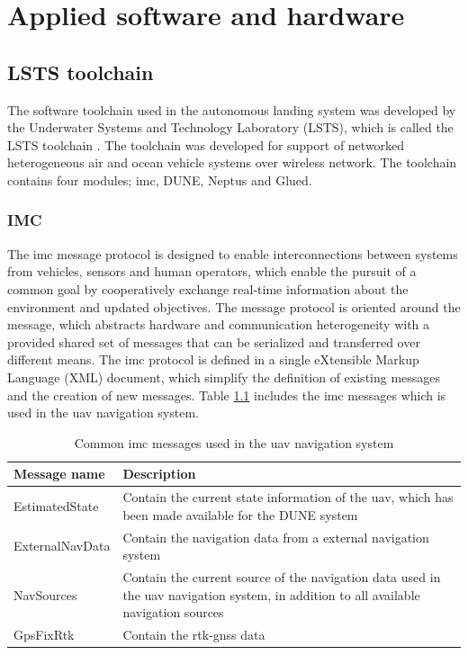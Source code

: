 \chapter{Applied software and hardware}
\section{LSTS toolchain}
The software toolchain used in the autonomous landing system was developed by the Underwater Systems and Technology Laboratory (LSTS), which is called the LSTS toolchain \citep{pinto2013lsts}. The toolchain was developed for support of networked heterogeneous air and ocean vehicle systems over wireless network. The toolchain contains four modules; \gls{imc}, DUNE, Neptus and Glued.
\subsection{IMC}
The \acrfull{imc} message protocol \citep{martins2009imc} is designed to enable interconnections between systems from vehicles, sensors and human operators, which enable the pursuit of a common goal by cooperatively exchange real-time information about the environment and updated objectives. The message protocol is oriented around the message, which abstracts hardware and communication heterogeneity with a provided shared set of messages that can be serialized and transferred over different means. The \gls{imc} protocol is defined in a single eXtensible Markup Language (XML) document, which simplify the definition of existing messages and the creation of new messages. Table \ref{Tb:IMCmessages} includes the \gls{imc} messages which is used in the \gls{uav} navigation system.
\begin{table}[H]
\centering
\begin{tabular}{| p{2.5cm} | p{9cm} |}
\hline
\textbf{Message name} & \textbf{Description} \\ \hline
EstimatedState	& Contain the current state information of the \gls{uav}, which has been made available for the DUNE system	\\ \hline
ExternalNavData & Contain the navigation data from a external navigation system	\\ \hline
NavSources		& Contain the current source of the navigation data used in the \gls{uav} navigation system, in addition to all available navigation sources\\ \hline
GpsFixRtk		& Contain the \gls{rtk-gnss} data \\ \hline
\end{tabular}
\caption{Common \gls{imc} messages used in the \gls{uav} navigation system}
\label{Tb:IMCmessages}
\end{table}
